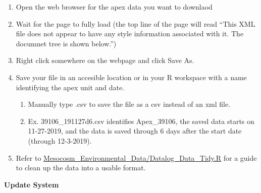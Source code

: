 \documentclass[]{book}
\providecommand{\tightlist}{%
  \setlength{\itemsep}{0pt}\setlength{\parskip}{0pt}}
\begin{document}
\begin{enumerate}
  \begin{enumerate}
  \def\labelenumii{\arabic{enumii}.}
  \tightlist
  \item
    Open the web browser for the apex data you want to downlaod
  \item
    Wait for the page to fully load (the top line of the page will read
    ``This XML file does not appear to have any style information
    associated with it. The documnet tree is shown below.'')
  \item
    Right click somewhere on the webpage and click Save As.
  \item
    Save your file in an accesible location or in your R workspace with
    a name identifying the apex unit and date.

    \begin{enumerate}
    \def\labelenumiii{\arabic{enumiii}.}
    \tightlist
    \item
      Manually type .csv to save the file as a csv instead of an xml
      file.
    \item
      Ex. 39106\_191127d6.csv identifies Apex\_39106, the saved data
      starts on 11-27-2019, and the data is saved through 6 days after
      the start date (through 12-3-2019).
    \end{enumerate}
  \item
    Refer to
    \href{https://github.com/SilbigerLab/Mesocosm_Environmental_Data/blob/master/Datalog_Data_Tidy.R}{Mesocosm\_Environmental\_Data/Datalog\_Data\_Tidy.R}
    for a guide to clean up the data into a usable format.
  \end{enumerate}
\end{enumerate}

 \textbf{Update System}
\end{document}
